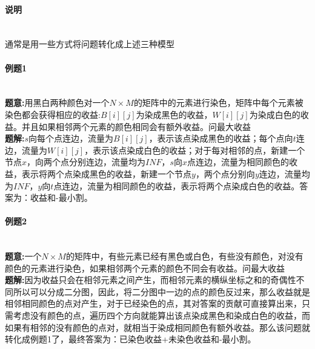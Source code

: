 \paragraph{说明}~{}
\\
通常是用一些方式将问题转化成上述三种模型
\paragraph{例题1}~{
    \\
    \textbf{题意:}用黑白两种颜色对一个$N \times M$的矩阵中的元素进行染色，矩阵中每个元素被染色都会获得相应的收益:$B[i][j]$为染成黑色的收益，$W[i][j]$为染成白色的收益。并且如果相邻两个元素的颜色相同会有额外收益。问最大收益
    \\
    \textbf{题解:}$s$向每个点连边，流量为$B[i][j]$，表示该点染成黑色的收益；每个点向$t$连边，流量为$W[i][j]$，表示该点染成白色的收益；对于每对相邻的点，新建一个节点$x$，向两个点分别连边，流量均为$INF$，$s$向$x$点连边，流量为相同颜色的收益，表示将两个点染成黑色的收益，新建一个节点$y$，两个点分别向$y$连边，流量均为$INF$，$y$向$t$点连边，流量为相同颜色的收益，表示将两个点染成白色的收益。答案为：收益和-最小割。
}
\paragraph{例题2}~{
    \\
    \textbf{题意:}一个$N \times M$的矩阵中，有些元素已经有黑色或白色，有些没有颜色，对没有颜色的元素进行染色，如果相邻两个元素的颜色不同会有收益。问最大收益\\
    \textbf{题解:}因为收益只会在相邻元素之间产生，而相邻元素的横纵坐标之和的奇偶性不同所以可以分成二分图，因此，将二分图中一边的点的颜色反过来，那么收益就是相邻相同颜色的点对产生，对于已经染色的点，其对答案的贡献可直接算出来，只需考虑没有颜色的点，遍历四个方向就能算出该点染成黑色和染成白色的收益，而如果有相邻的没有颜色的点对，就相当于染成相同颜色有额外收益。那么该问题就转化成例题1了，最终答案为：已染色收益+未染色收益和-最小割。 
}
